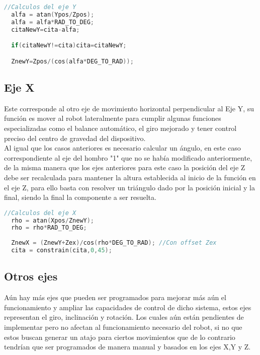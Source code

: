 \documentclass[12pt,letterpaper]{IEEEtran}
\begin{document}
\begin{lstlisting}[language=c++]
  //Calculos del eje Y
  alfa = atan(Ypos/Zpos);
  alfa = alfa*RAD_TO_DEG;
  citaNewY=cita-alfa;

  if(citaNewY!=cita)cita=citaNewY;

  ZnewY=Zpos/(cos(alfa*DEG_TO_RAD));
\end{lstlisting}

\subsection*{Eje X}
Este corresponde al otro eje de movimiento horizontal perpendicular al Eje Y, su función es mover al robot lateralmente para cumplir algunas funciones especializadas como el balance automático, el giro mejorado y tener control preciso del centro de gravedad del dispositivo.\\

Al igual que los casos anteriores es necesario calcular un ángulo, en este caso correspondiente al eje del hombro "1" que no se había modificado anteriormente, de la misma manera que los ejes anteriores para este caso la posición del eje Z debe ser recalculada para mantener la altura establecida al inicio de la función en el eje Z, para ello basta con resolver un triángulo dado por la posición inicial y la final, siendo la final la componente a ser resuelta.

\begin{lstlisting}[language=c++]
  //Calculos del eje X
  rho = atan(Xpos/ZnewY);
  rho = rho*RAD_TO_DEG;
  
  ZnewX = (ZnewY+Zex)/cos(rho*DEG_TO_RAD); //Con offset Zex
  cita = constrain(cita,0,45);
\end{lstlisting}

\subsection*{Otros ejes}
Aún hay más ejes que pueden ser programados para mejorar más aún el funcionamiento y ampliar las capacidades de control de dicho sistema, estos ejes representan el giro, inclinación y rotación. Los cuales aún están pendientes de implementar pero no afectan al funcionamiento necesario del robot, si no que estos buscan generar un atajo para ciertos movimientos que de lo contrario tendrían que ser programados de manera manual y basados en los ejes X,Y y Z.\\
\end{document}
